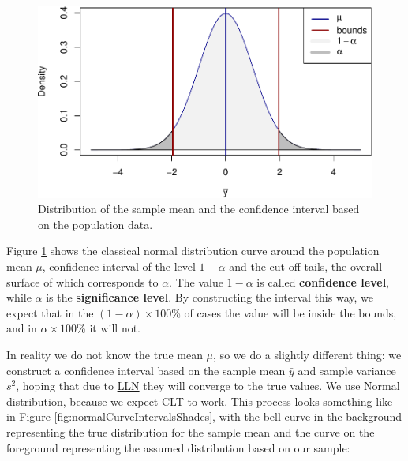\documentclass[
]{book}
\theoremstyle{definition}
\theoremstyle{definition}
\theoremstyle{definition}
\theoremstyle{definition}
\theoremstyle{remark}
\begin{document}
\begin{figure}
\centering
\includegraphics{Svetunkov---Statistics-for-Business-Analytics_files/figure-latex/normalCurveIntervals-1.pdf}
\caption{\label{fig:normalCurveIntervals}Distribution of the sample mean and the confidence interval based on the population data.}
\end{figure}

Figure \ref{fig:normalCurveIntervals} shows the classical normal distribution curve around the population mean \(\mu\), confidence interval of the level \(1-\alpha\) and the cut off tails, the overall surface of which corresponds to \(\alpha\). The value \(1-\alpha\) is called \textbf{confidence level}, while \(\alpha\) is the \textbf{significance level}. By constructing the interval this way, we expect that in the \((1-\alpha)\times 100\)\% of cases the value will be inside the bounds, and in \(\alpha\times 100\)\% it will not.

In reality we do not know the true mean \(\mu\), so we do a slightly different thing: we construct a confidence interval based on the sample mean \(\bar{y}\) and sample variance \(s^2\), hoping that due to \protect\hyperlink{LLNandCLT}{LLN} they will converge to the true values. We use Normal distribution, because we expect \protect\hyperlink{LLNandCLT}{CLT} to work. This process looks something like in Figure \ref{fig:normalCurveIntervalsShades}, with the bell curve in the background representing the true distribution for the sample mean and the curve on the foreground representing the assumed distribution based on our sample:
\end{document}
